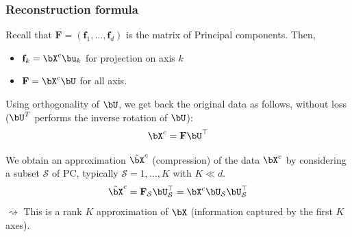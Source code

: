 \documentclass{beamer}\usepackage[]{graphicx}\usepackage[]{color}
\begin{document}
\begin{frame}
  \frametitle{Reconstruction formula}

    Recall that $\mathbf{F} = (\mathbf{f}_1, \dots, \mathbf{f}_d) $ is the matrix of Principal components. Then,  
    \begin{itemize}
      \item  $\mathbf{f}_k = \bX^c \bu_k$ for projection on axis $k$
      \item $\mathbf{F} = \bX^c \bU$ for all axis.
    \end{itemize}
    Using orthogonality of $\bU$, we get back the original data as follows, without loss ($\bU^T$ performs the inverse rotation of $\bU$):
    \begin{equation*}
      \bX^c = \mathbf{F}\bU^\top 
    \end{equation*}

    \vfill
    \pause 
    
    We obtain an approximation $\tilde\bX^c$ (compression) of the data $\bX^c$ by considering a subset $\mathcal{S}$ of PC, typically $\mathcal{S} = {1, \dots,K}$ with $K \ll d$.
    \begin{equation*}
      \tilde\bX^c = \mathbf{F}_{\mathcal{S}}\bU_{\mathcal{S}}^\top = \bX^c \bU_{\mathcal{S}} \bU_{\mathcal{S}}^\top
    \end{equation*}
    $\rightsquigarrow$ This is a rank $K$ approximation of $\bX$ (information captured by the first $K$ axes).

\end{frame}
\end{document}
